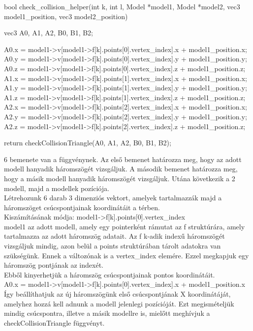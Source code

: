 \begin{cpp}
bool check_collision_helper(int k, int l, Model *model1, 
Model *model2, vec3 model1_position, vec3 model2_position)
{
    vec3 A0, A1, A2, B0, B1, B2;
		
    A0.x = model1->v[model1->f[k].points[0].vertex_index].x 
    + model1_position.x;
    A0.y = model1->v[model1->f[k].points[0].vertex_index].y 
    + model1_position.y;
    A0.z = model1->v[model1->f[k].points[0].vertex_index].z 
    + model1_position.z;
    A1.x = model1->v[model1->f[k].points[1].vertex_index].x 
    + model1_position.x;
    A1.y = model1->v[model1->f[k].points[1].vertex_index].y 
    + model1_position.y;
    A1.z = model1->v[model1->f[k].points[1].vertex_index].z 
    + model1_position.z;
    A2.x = model1->v[model1->f[k].points[2].vertex_index].x 
    + model1_position.x;
    A2.y = model1->v[model1->f[k].points[2].vertex_index].y 
    + model1_position.y;
    A2.z = model1->v[model1->f[k].points[2].vertex_index].z 
    + model1_position.z;

    return checkCollisionTriangle(A0, A1, A2, B0, B1, B2);
}
\end{cpp}
6 bemenete van a függvénynek. Az első bemenet határozza meg, hogy az adott modell hanyadik háromszögét vizsgáljuk. A második bemenet határozza meg, hogy a másik modell hanyadik háromszögét vizsgáljuk. Utána következik a 2 modell, majd a modellek pozíciója.\\
Létrehozunk 6 darab 3 dimenziós vektort, amelyek tartalmazzák majd a háromszöget csúcspontjainak koordinátáit a térben. \\
Kiszámításának módja: model1->f[k].points[0].vertex\_index \\
model1 az adott modell, amely egy pointerként rámutat az f struktúrára, amely tartalmazza az adott háromszög adatait. Az f k-adik indexű háromszögét vizsgáljuk mindig, azon belül a points struktúrában tárolt adatokra van szükségünk. Ennek a változónak is a vertex\_index elemére. Ezzel megkapjuk egy háromszög pontjának az indexét.\\
Ebből kinyerhetjük a háromszög csúcspontjainak pontos koordinátáit.\\
A0.x = model1->v[model1->f[k].points[0].vertex\_index].x 
	+ model1\_position.x\\
Így beállíthatjuk az új háromszögünk első csúcspontjának X koordinátáját, amelyhez hozzá kell adnunk a modell jelenlegi pozícióját. Ezt megismételjük mindig csúcspontra, illetve a másik modellre is, mielőtt meghívjuk a checkCollisionTriangle függvényt.


